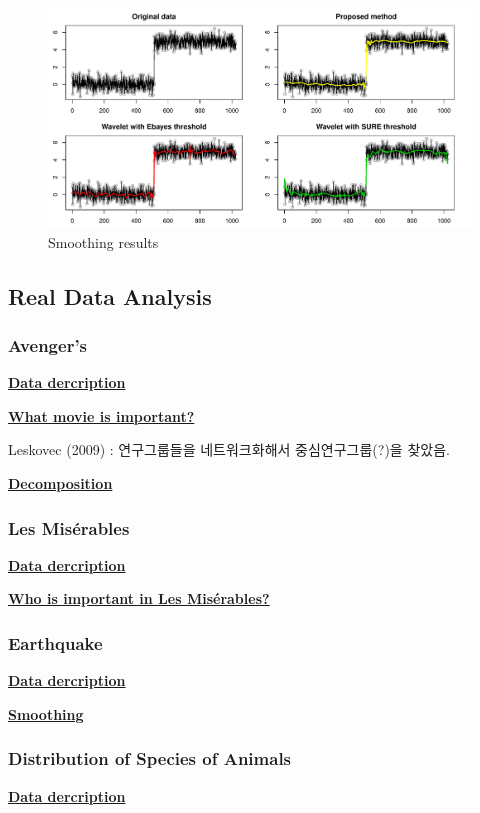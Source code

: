\documentclass[preprint, review, 12pt]{article}
\theoremstyle{definition}
\theoremstyle{remark}
\begin{document}
\begin{figure}
	\centering
	\includegraphics[width=1\textwidth]{Fig/snow_ex2_fig2.pdf}
	\caption{Smoothing results} 
	\label{snow:ex2_2}
\end{figure}


\subsection{Real Data Analysis}
\subsubsection{Avenger's}
\noindent\textbf{\underline{Data dercription}}

\noindent\textbf{\underline{What movie is important?}}

Leskovec (2009) : 연구그룹들을 네트워크화해서 중심연구그룹(?)을 찾았음. 

\noindent\textbf{\underline{Decomposition}}

\subsubsection{Les Misérables}
\noindent\textbf{\underline{Data dercription}}

\noindent\textbf{\underline{Who is important in Les Misérables?}}

\subsubsection{Earthquake}
\noindent\textbf{\underline{Data dercription}}

\noindent\textbf{\underline{Smoothing}}

\subsubsection{Distribution of Species of Animals} 
\noindent\textbf{\underline{Data dercription}}
\end{document}
